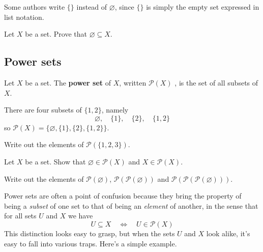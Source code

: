 Some authors write $\{ \}$ instead of $\varnothing$, since $\{ \}$ is simply the empty set expressed in list notation.

\begin{exercise}
\label{exEmptySetSubsetOfEverySet}
Let $X$ be a set. Prove that $\varnothing \subseteq X$.
\end{exercise}

\subsection*{Power sets}

\begin{definition}
\label{defPowerSet}
Let $X$ be a set. The \textbf{power set} of $X$, written $\mathcal{P}(X)$ , is the set of all subsets of $X$.
\end{definition}

\begin{example}
There are four subsets of $\{ 1, 2 \}$, namely
\[ \varnothing, \quad \{ 1 \}, \quad \{ 2 \}, \quad \{ 1, 2 \} \]
so $\mathcal{P}(X) = \{\varnothing, \{ 1 \}, \{ 2 \}, \{ 1, 2 \}\}$.
\end{example}

\begin{exercise}
Write out the elements of $\mathcal{P}(\{1, 2, 3\})$.
\end{exercise}

\begin{exercise}
Let $X$ be a set. Show that $\varnothing \in \mathcal{P}(X)$ and $X \in \mathcal{P}(X)$.
\end{exercise}

\begin{exercise}
Write out the elements of $\mathcal{P}(\varnothing)$, $\mathcal{P}(\mathcal{P}(\varnothing))$ and $\mathcal{P}(\mathcal{P}(\mathcal{P}(\varnothing)))$.
\end{exercise}

Power sets are often a point of confusion because they bring the property of being a \textit{subset} of one set to that of being an \textit{element} of another, in the sense that for all sets $U$ and $X$ we have
\[ U \subseteq X \quad \Leftrightarrow \quad U \in \mathcal{P}(X) \]
This distinction looks easy to grasp, but when the sets $U$ and $X$ look alike, it's easy to fall into various traps. Here's a simple example.

